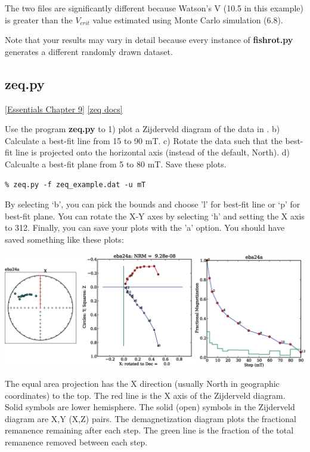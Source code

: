 \documentclass[11pt]{book}
\begin{document}
{{ The two files are significantly different because Watson's V (10.5 in this example) is greater than the $V_{crit}$ value estimated using Monte Carlo simulation (6.8).   
 
 Note that your results may vary in detail because every instance of {\bf fishrot.py}  generates  a different randomly drawn dataset.  

%
\subsection{zeq.py} 
\href{http://magician.ucsd.edu/Essentials_2/WebBook2ch9.html#ch9}{[Essentials Chapter 9]}
\href{http://earthref.org/PmagPy/pmagpydocs/zeq-module.html}{[zeq docs]}

Use the program {\bf zeq.py} to 1) plot a Zijderveld diagram of the data in .  b) Calculate a best-fit line from 15 to 90 mT.  c) Rotate the data such that the best-fit line is projected onto the horizontal axis (instead of the default, North).   d) Calcualte a best-fit plane from 5 to 80 mT.  Save these plots. 


\begin{verbatim}
% zeq.py -f zeq_example.dat -u mT
\end{verbatim}

 By selecting `b', you can pick the bounds and choose 'l' for best-fit line or  `p' for best-fit plane.  You can rotate the X-Y axes  by selecting `h' and setting the X axis to 312.   Finally, you can save your plots with the 'a' option.   You should have saved something like these plots:

{ %
\includegraphics[width=15cm]{EPSfiles/zeq.eps}}

The equal area projection has the X direction (usually North in geographic coordinates)
          to the top.  The red line is the X axis of the Zijderveld diagram.  Solid symbols are lower hemisphere. 
          The solid (open) symbols in the Zijderveld diagram are X,Y (X,Z) pairs.  The demagnetization diagram plots the
          fractional remanence remaining after each step. The green line is the fraction of the total remanence removed 
          between each step.  




}}
\end{document}
